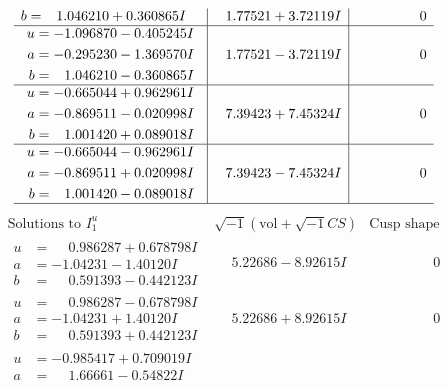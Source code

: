 \documentclass[1p]{elsarticle_modified}
\theoremstyle{definition}
\newcommand{\I}{\sqrt{-1}}
\begin{document}
$$\begin{array}{c|c|c}
\begin{aligned}
b &= \phantom{-}1.046210 + 0.360865 I\end{aligned}
 & \phantom{-}1.77521 + 3.72119 I & \phantom{-0.000000 } 0 \\ \hline\begin{aligned}
u &= -1.096870 - 0.405245 I \\
a &= -0.295230 - 1.369570 I \\
b &= \phantom{-}1.046210 - 0.360865 I\end{aligned}
 & \phantom{-}1.77521 - 3.72119 I & \phantom{-0.000000 } 0 \\ \hline\begin{aligned}
u &= -0.665044 + 0.962961 I \\
a &= -0.869511 - 0.020998 I \\
b &= \phantom{-}1.001420 + 0.089018 I\end{aligned}
 & \phantom{-}7.39423 + 7.45324 I & \phantom{-0.000000 } 0 \\ \hline\begin{aligned}
u &= -0.665044 - 0.962961 I \\
a &= -0.869511 + 0.020998 I \\
b &= \phantom{-}1.001420 - 0.089018 I\end{aligned}
 & \phantom{-}7.39423 - 7.45324 I & \phantom{-0.000000 } 0\\
 \hline 
 \end{array}$$\newpage$$\begin{array}{c|c|c}  
\text{Solutions to }I^u_{1}& \I (\text{vol} + \sqrt{-1}CS) & \text{Cusp shape}\\
 \hline 
\begin{aligned}
u &= \phantom{-}0.986287 + 0.678798 I \\
a &= -1.04231 - 1.40120 I \\
b &= \phantom{-}0.591393 - 0.442123 I\end{aligned}
 & \phantom{-}5.22686 - 8.92615 I & \phantom{-0.000000 } 0 \\ \hline\begin{aligned}
u &= \phantom{-}0.986287 - 0.678798 I \\
a &= -1.04231 + 1.40120 I \\
b &= \phantom{-}0.591393 + 0.442123 I\end{aligned}
 & \phantom{-}5.22686 + 8.92615 I & \phantom{-0.000000 } 0 \\ \hline\begin{aligned}
u &= -0.985417 + 0.709019 I \\
a &= \phantom{-}1.66661 - 0.54822 I \\

\end{aligned}
\end{array}$$
\end{document}
